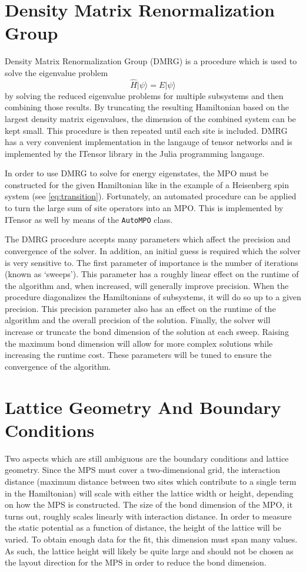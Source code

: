 \documentclass[a4paper,oneside, 11pt,english,listof=totoc,bibliography=totoc]{scrbook}
\begin{document}
\section{Density Matrix Renormalization Group}\label{sec:dmrg}
Density Matrix Renormalization Group (DMRG) is a procedure which is used to solve the eigenvalue problem
\begin{equation}\label{eq:dmrg}
    \hat{H}|\psi\rangle=E|\psi\rangle
\end{equation}
by solving the reduced eigenvalue problems for multiple subsystems and then combining those results. By truncating the resulting Hamiltonian based on the largest density matrix eigenvalues, the dimension of the combined system can be kept small. This procedure is then repeated until each site is included. DMRG has a very convenient implementation in the langauge of tensor networks and is implemented by the ITensor library in the Julia programming langauge\cite{ITensor}.

In order to use DMRG to solve for energy eigenstates, the MPO must be constructed for the given Hamiltonian like in the example of a Heisenberg spin system (see \ref{eq:transition}). Fortunately, an automated procedure can be applied to turn the large sum of site operators into an MPO. This is implemented by ITensor as well by means of the \verb|AutoMPO| class.

The DMRG procedure accepts many parameters which affect the precision and convergence of the solver. In addition, an initial guess is required which the solver is very sensitive to. The first parameter of importance is the number of iterations (known as `sweeps'). This parameter has a roughly linear effect on the runtime of the algorithm and, when increased, will generally improve precision. When the procedure diagonalizes the Hamiltonians of subsystems, it will do so up to a given precision. This precision parameter also has an effect on the runtime of the algorithm and the overall precision of the solution. Finally, the solver will increase or truncate the bond dimension of the solution at each sweep. Raising the maximum bond dimension will allow for more complex solutions while increasing the runtime cost. These parameters will be tuned to ensure the convergence of the algorithm.

\section{Lattice Geometry And Boundary Conditions}
Two aspects which are still ambiguous are the boundary conditions and lattice geometry. Since the MPS must cover a two-dimensional grid, the interaction distance (maximum distance between two sites which contribute to a single term in the Hamiltonian) will scale with either the lattice width or height, depending on how the MPS is constructed. The size of the bond dimension of the MPO, it turns out, roughly scales linearly with interaction distance. In order to measure the static potential as a function of distance, the height of the lattice will be varied. To obtain enough data for the fit, this dimension must span many values. As such, the lattice height will likely be quite large and should not be chosen as the layout direction for the MPS in order to reduce the bond dimension.
\end{document}
